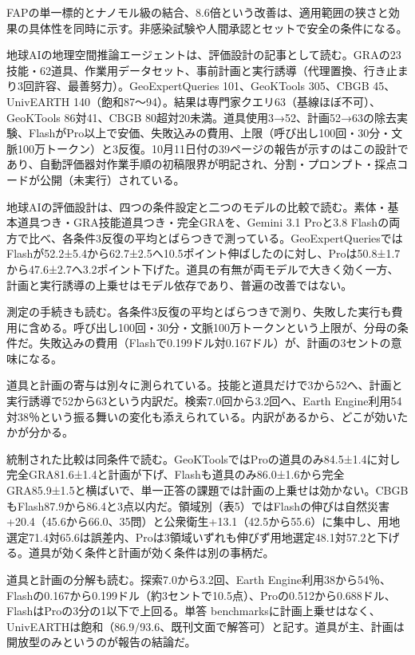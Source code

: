 \documentclass[lualatex,a4paper,10pt]{jlreq}
\begin{document}
FAPの単一標的とナノモル級の結合、8.6倍という改善は、適用範囲の狭さと効果の具体性を同時に示す。非感染試験や人間承認とセットで安全の条件になる。
\cite{B46,B83,B44,B43,B45}


地球AIの地理空間推論エージェントは、評価設計の記事として読む。GRAの23技能・62道具、作業用データセット、事前計画と実行誘導（代理置換、行き止まり3回許容、最善努力）。GeoExpertQueries 101、GeoKTools 305、CBGB 45、UnivEARTH 140（飽和87〜94）。結果は専門家クエリ63（基線ほぼ不可）、GeoKTools 86対41、CBGB 80超対20未満。道具使用3→52、計画52→63の除去実験、FlashがPro以上で安価、失敗込みの費用、上限（呼び出し100回・30分・文脈100万トークン）と3反復。10月11日付の39ページの報告が示すのはこの設計であり、自動評価器対作業手順の初稿限界が明記され、分割・プロンプト・採点コードが公開（未実行）されている。
\cite{B47,B84,B48,B61}


地球AIの評価設計は、四つの条件設定と二つのモデルの比較で読む。素体・基本道具つき・GRA技能道具つき・完全GRAを、Gemini 3.1 Proと3.8 Flashの両方で比べ、各条件3反復の平均とばらつきで測っている。GeoExpertQueriesではFlashが52.2±5.4から62.7±2.5へ10.5ポイント伸ばしたのに対し、Proは50.8±1.7から47.6±2.7へ3.2ポイント下げた。道具の有無が両モデルで大きく効く一方、計画と実行誘導の上乗せはモデル依存であり、普遍の改善ではない。
\cite{B47,B84,B48}


測定の手続きも読む。各条件3反復の平均とばらつきで測り、失敗した実行も費用に含める。呼び出し100回・30分・文脈100万トークンという上限が、分母の条件だ。失敗込みの費用（Flashで0.199ドル対0.167ドル）が、計画の3セントの意味になる。
\cite{B47,B84,B48}


道具と計画の寄与は別々に測られている。技能と道具だけで3から52へ、計画と実行誘導で52から63という内訳だ。検索7.0回から3.2回へ、Earth Engine利用54対38％という振る舞いの変化も添えられている。内訳があるから、どこが効いたかが分かる。
\cite{B47,B84,B48}


統制された比較は同条件で読む。GeoKToolsではProの道具のみ84.5±1.4に対し完全GRA81.6±1.4と計画が下げ、Flashも道具のみ86.0±1.6から完全GRA85.9±1.5と横ばいで、単一正答の課題では計画の上乗せは効かない。CBGBもFlash87.9から86.4と3点以内だ。領域別（表5）ではFlashの伸びは自然災害+20.4（45.6から66.0、35問）と公衆衛生+13.1（42.5から55.6）に集中し、用地選定71.4対65.6は誤差内、Proは3領域いずれも伸びず用地選定48.1対57.2と下げる。道具が効く条件と計画が効く条件は別の事柄だ。
\cite{B47,B84,B48}


道具と計画の分解も読む。探索7.0から3.2回、Earth Engine利用38から54％、Flashの0.167から0.199ドル（約3セントで10.5点）、Proの0.512から0.688ドル、FlashはProの3分の1以下で上回る。単答 benchmarksに計画上乗せはなく、UnivEARTHは飽和（86.9/93.6、既刊文面で解答可）と記す。道具が主、計画は開放型のみというのが報告の結論だ。
\cite{B47,B84,B48}
\end{document}
